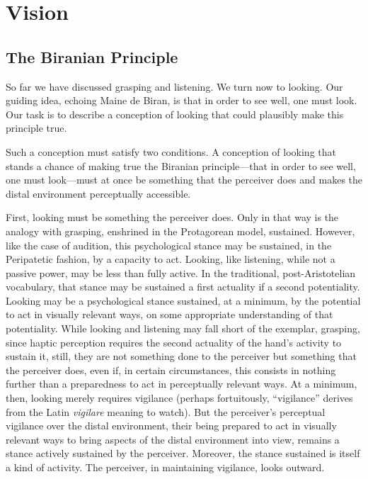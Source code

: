 \chapter{Vision} %
\label{cha:vision}

\section{The Biranian Principle} %
\label{sec:the_birnaian_principle}

So far we have discussed grasping and listening. We turn now to looking. Our guiding idea, echoing Maine de Biran, is that in order to see well, one must look. Our task is to describe a conception of looking that could plausibly make this principle true. 

Such a conception must satisfy two conditions. A conception of looking that stands a chance of making true the Biranian principle---that in order to see well, one must look---must at once be something that the perceiver does and makes the distal environment perceptually accessible.

First, looking must be something the perceiver does. Only in that way is the analogy with grasping, enshrined in the Protagorean model, sustained. However, like the case of audition, this psychological stance may be sustained, in the Peripatetic fashion, by a capacity to act. Looking, like listening, while not a passive power, may be less than fully active. In the traditional, post-Aristotelian vocabulary, that stance may be sustained a first actuality if a second potentiality. Looking may be a psychological stance sustained, at a minimum, by the potential to act in visually relevant ways, on some appropriate understanding of that potentiality. While looking and listening may fall short of the exemplar, grasping, since haptic perception requires the second actuality of the hand's activity to sustain it, still, they are not something done to the perceiver but something that the perceiver does, even if, in certain circumstances, this consists in nothing further than a preparedness to act in perceptually relevant ways. At a minimum, then, looking merely requires vigilance (perhaps fortuitously, ``vigilance'' derives from the Latin \emph{vigilare} meaning to watch). But the perceiver's perceptual vigilance over the distal environment, their being prepared to act in visually relevant ways to bring aspects of the distal environment into view, remains a stance actively sustained by the perceiver. Moreover, the stance sustained is itself a kind of activity. The perceiver, in maintaining vigilance, looks outward.

